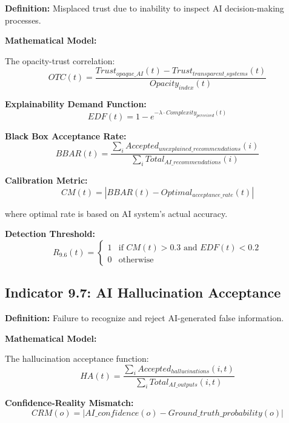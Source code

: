 \documentclass[11pt,a4paper]{article}
\begin{document}
\textbf{Definition:} Misplaced trust due to inability to inspect AI decision-making processes.

\textbf{Mathematical Model:}

The opacity-trust correlation:
\begin{equation}
OTC(t) = \frac{Trust_{opaque\_AI}(t) - Trust_{transparent\_systems}(t)}{Opacity_{index}(t)}
\end{equation}

\textbf{Explainability Demand Function:}
\begin{equation}
EDF(t) = 1 - e^{-\lambda \cdot Complexity_{perceived}(t)}
\end{equation}

\textbf{Black Box Acceptance Rate:}
\begin{equation}
BBAR(t) = \frac{\sum_{i} Accepted_{unexplained\_recommendations}(i)}{\sum_{i} Total_{AI\_recommendations}(i)}
\end{equation}

\textbf{Calibration Metric:}
\begin{equation}
CM(t) = |BBAR(t) - Optimal_{acceptance\_rate}(t)|
\end{equation}

where optimal rate is based on AI system's actual accuracy.

\textbf{Detection Threshold:}
\begin{equation}
R_{9.6}(t) = \begin{cases}
1 & \text{if } CM(t) > 0.3 \text{ and } EDF(t) < 0.2 \\
0 & \text{otherwise}
\end{cases}
\end{equation}

\subsection{Indicator 9.7: AI Hallucination Acceptance}

\textbf{Definition:} Failure to recognize and reject AI-generated false information.

\textbf{Mathematical Model:}

The hallucination acceptance function:
\begin{equation}
HA(t) = \frac{\sum_{i} Accepted_{hallucinations}(i,t)}{\sum_{i} Total_{AI\_outputs}(i,t)}
\end{equation}

\textbf{Confidence-Reality Mismatch:}
\begin{equation}
CRM(o) = |AI\_confidence(o) - Ground\_truth\_probability(o)|
\end{equation}
\end{document}
